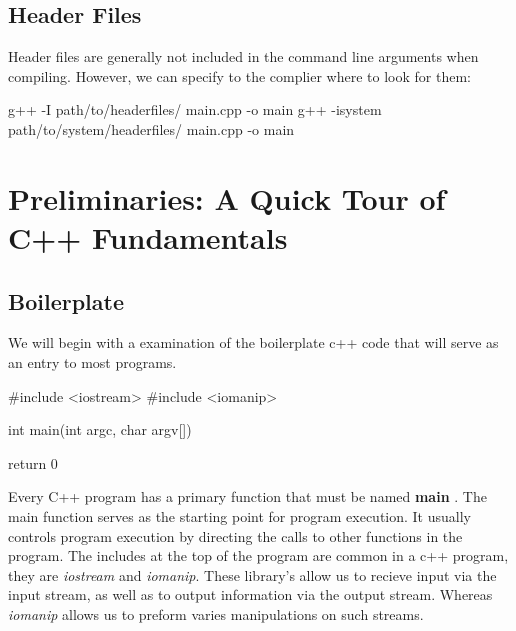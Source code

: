 \documentclass{report}
\begin{document}
    \bigbreak \noindent 
    \subsection{Header Files}
    Header files are generally not included in the command line arguments when compiling. However, we can specify to the complier where to look for them:
    \bigbreak \noindent 
    
    \begin{cppcode}
g++ -I path/to/headerfiles/ main.cpp -o main
g++ -isystem path/to/system/headerfiles/ main.cpp -o main
    \end{cppcode}
    
















    \pagebreak \bigbreak \noindent 
    \section{\LARGE Preliminaries: A Quick Tour of C++ Fundamentals}
    \bigbreak \noindent 
    \subsection{Boilerplate}
    \bigbreak \noindent 
    We will begin with a examination of the boilerplate c++ code that will serve as an entry to most programs.
    
    \begin{cppcode}
#include <iostream>
#include <iomanip>

int main(int argc, char argv[]){

    return 0
}
    \end{cppcode}
    
    \bigbreak \noindent 
    Every C++ program has a primary function that must be named \textbf{main} . The main function serves as the starting point for program execution. It usually controls program execution by directing the calls to other functions in the program.
    \bigbreak \noindent 
    The includes at the top of the program are common in a c++ program, they are \textit{iostream} and \textit{iomanip}. These library's allow us to recieve input via the input stream, as well as to output information  via the output stream. Whereas \textit{iomanip} allows us to preform varies manipulations on such streams.
    \bigbreak \noindent 
\end{document}
